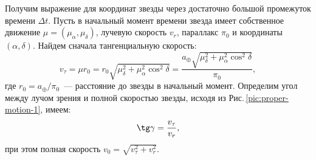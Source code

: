 \begin{figure}[h!]
\begin{subfigure}[b]{0.47\tw}
		\caption{}
		\label{pic:proper-motion-2}
	\end{subfigure}
	\caption{}
\end{figure}

Получим выражение для координат звезды через достаточно большой промежуток времени $\Delta t$. Пусть в начальный момент времени звезда имеет собственное движение $\mu = (\mu_\alpha, \mu_\delta)$, лучевую скорость $v_r$, параллакс $\pi_0$ и координаты $(\alpha, \delta)$. Найдем сначала тангенциальную скорость:
\begin{equation*}
	v_\tau =  \mu r_0 = r_0 \sqrt{ \mu_\delta^2 + \mu_\alpha^2 \cos^2 \delta} = \frac{a_\oplus \sqrt{ \mu_\delta^2 + \mu_\alpha^2 \cos^2 \delta}}{\pi_0},
\end{equation*}
где $r_0 = a_\oplus / \pi_0$~--- расстояние до звезды в начальный момент.
Определим угол между лучом зрения и полной скоростью звезды, исходя из Рис.\,\ref{pic:proper-motion-1}, имеем:
\begin{equation*}
	\tg \gamma = \frac{v_\tau}{v_r},
\end{equation*}
при этом полная скорость $v_0 = \sqrt{v_\tau^2 + v_r^2}$. 

